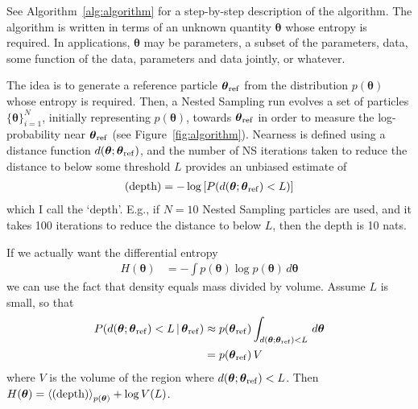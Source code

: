 \documentclass[entropy,article,accept,oneauthor,pdftex,10pt,a4paper]{mdpi}
\newcommand{\x}{\boldsymbol{\theta}}
\newcommand{\depth}{(\textnormal{depth})}
\newcommand{\xref}{\x_{\rm ref}}
\begin{document}
See Algorithm~\ref{alg:algorithm} for a step-by-step description of the
algorithm. The algorithm is written in terms of an unknown quantity $\x$
whose entropy is required. In applications, $\x$ may be parameters,
a subset of the parameters, data, some function of the data,
parameters and data jointly, or whatever.

The idea is to generate a reference particle $\xref$
from the distribution $p(\x)$
whose entropy is required. Then, a Nested Sampling run evolves a set of
particles $\{\x\}_{i=1}^N$, initially representing $p(\x)$,
towards $\xref$ in order to measure the log-probability near
$\xref$ (see Figure~\ref{fig:algorithm}).
Nearness is defined using a distance function
$d(\x; \xref)$, and the number of NS iterations taken to reduce
the distance to below some threshold $L$ provides an unbiased estimate of
\begin{align}
   \depth = -\log \left[ P(d(\x; \xref) < L) \right]
\end{align}
which I call the `depth'. E.g., if $N=10$ Nested Sampling particles are used,
and it takes 100 iterations to reduce the distance to below $L$, then the
depth is 10 nats.

If we actually want the differential entropy
\begin{align}
H(\x) &= -\int p(\x) \log p(\x) \, d\x
\end{align}
we can use the fact that density equals mass divided
by volume. Assume $L$ is small, so that
\begin{align}
P(d(\x; \xref) < L \,|\, \xref)
    &\approx
    p(\xref) \int_{d(\x; \xref) < L} \, d\x\\
    &= p(\xref) \, V
\end{align}
where $V$ is the volume of the region where $d(\x; \xref) < L$.
Then $H(\x) = \left< \depth \right>_{p(\x)} + \log V(L)$.
\end{document}
